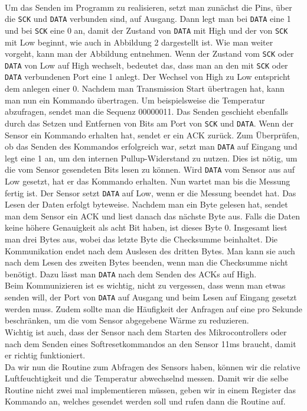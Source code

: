 \documentclass[]{article}
\begin{document}
\\ Um das Senden im Programm zu realisieren, setzt man zunächst die Pins, über die \texttt{SCK} und \texttt{DATA} verbunden sind, auf Ausgang. Dann legt man bei \texttt{DATA} eine 1 und bei \texttt{SCK} eine 0 an, damit der Zustand von \texttt{DATA} mit High und der von \texttt{SCK} mit Low beginnt, wie auch in Abbildung 2 dargestellt ist. Wie man weiter vorgeht, kann man der Abbildung entnehmen. Wenn der Zustand vom \texttt{SCK} oder \texttt{DATA} von Low auf High wechselt, bedeutet das, dass man an den mit \texttt{SCK} oder \texttt{DATA} verbundenen Port eine 1 anlegt. Der Wechsel von High zu Low entspricht dem anlegen einer 0. Nachdem man Transmission Start übertragen hat, kann man nun ein Kommando übertragen. Um beispielsweise die Temperatur abzufragen, sendet man die Sequenz 00000011. Das Senden geschieht ebenfalls durch das Setzen und Entfernen von Bits am Port von \texttt{SCK} und \texttt{DATA}. Wenn der Sensor ein Kommando erhalten hat, sendet er ein ACK zurück. Zum Überprüfen, ob das Senden des Kommandos erfolgreich war, setzt man \texttt{DATA} auf Eingang und legt eine 1 an, um den internen Pullup-Widerstand zu nutzen. Dies ist nötig, um die vom Sensor gesendeten Bits lesen zu können. Wird \texttt{DATA} vom Sensor aus auf Low gesetzt, hat er das Kommando erhalten. Nun wartet man bis die Messung fertig ist. Der Sensor setzt \texttt{DATA} auf Low, wenn er die Messung beendet hat. Das Lesen der Daten erfolgt byteweise. Nachdem man ein Byte gelesen hat, sendet man dem Sensor ein ACK und liest danach das nächste Byte aus. Falls die Daten keine höhere Genauigkeit als acht Bit haben, ist dieses Byte 0. Insgesamt liest man drei Bytes aus, wobei das letzte Byte die Checksumme beinhaltet. Die Kommunikation endet nach dem Auslesen des dritten Bytes. Man kann sie auch nach dem Lesen des zweiten Bytes beenden, wenn man die Checksumme nicht benötigt. Dazu lässt man \texttt{DATA} nach dem Senden des ACKs auf High. 
\\Beim Kommunizieren ist es wichtig, nicht zu vergessen, dass wenn man etwas senden will, der Port von \texttt{DATA} auf Ausgang und beim Lesen auf Eingang gesetzt werden muss. Zudem sollte man die Häufigkeit der Anfragen auf eine pro Sekunde beschränken, um die vom Sensor abgegebene Wärme zu reduzieren.
\\Wichtig ist auch, dass der Sensor nach dem Starten des Mikrocontrollers oder nach dem Senden eines Softresetkommandos an den Sensor 11ms braucht, damit er richtig funktioniert.
\\Da wir nun die Routine zum Abfragen des Sensors haben, können wir die relative Luftfeuchtigkeit und die Temperatur abwechselnd messen. Damit wir die selbe Routine nicht zwei mal implementieren müssen, geben wir in einem Register das Kommando an, welches gesendet werden soll und rufen dann die Routine auf.
\end{document}
